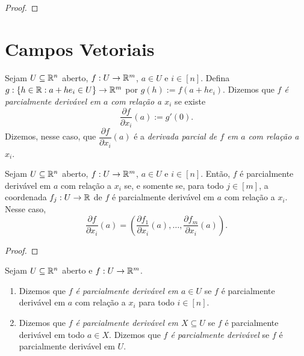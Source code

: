 \begin{proof}
    \blackproof
\end{proof}

\section{Campos Vetoriais}

\begin{definition}
    Sejam $U \subseteq \mathbb{R}^n$ aberto, $f : U \to \mathbb{R}^m$, $a \in U$ e $i \in [n]$. Defina $g :\{h \in \mathbb{R} : a + h e_i \in U \} \to \mathbb{R}^m$ por $g(h) := f(a + h e_i)$. Dizemos que \emph{$f$ é parcialmente derivável em $a$ com relação a $x_i$} se existe
        \[
            \dfrac{\partial f}{\partial x_i} (a) := g'(0).
        \]
    Dizemos, nesse caso, que $\dfrac{\partial f}{\partial x_i} (a)$ é a \emph{derivada parcial de $f$ em $a$ com relação a $x_i$}.
\end{definition}

\begin{proposition}
    Sejam $U \subseteq \mathbb{R}^n$ aberto, $f : U \to \mathbb{R}^m$, $a \in U$ e $i \in [n]$. Então, $f$ é parcialmente derivável em $a$ com relação a $x_i$ se, e somente se, para todo $j \in [m]$, a coordenada $f_j : U \to \mathbb{R}$ de $f$ é parcialmente derivável em $a$ com relação a $x_i$. Nesse caso,
        \[
            \dfrac{\partial f}{\partial x_i} (a) = \left( \dfrac{\partial f_1}{\partial x_i} (a), \ldots, \dfrac{\partial f_m}{\partial x_i} (a) \right).
        \]
\end{proposition}

\begin{proof}
    \blackproof
\end{proof}

\begin{definition}
    Sejam $U \subseteq \mathbb{R}^n$ aberto e $f : U \to \mathbb{R}^m$.
        \begin{enumerate}[leftmargin=*, align=left, label=\textbf{(\alph*)}]
            \item Dizemos que \emph{$f$ é parcialmente derivável em $a \in U$} se $f$ é parcialmente derivável em $a$ com relação a $x_i$ para todo $i \in [n]$.
            \item Dizemos que \emph{$f$ é parcialmente derivável em $X \subseteq U$} se $f$ é parcialmente derivável em todo $a \in X$. Dizemos que \emph{$f$ é parcialmente derivável} se $f$ é parcialmente derivável em $U$.
        \end{enumerate}
\end{definition}

